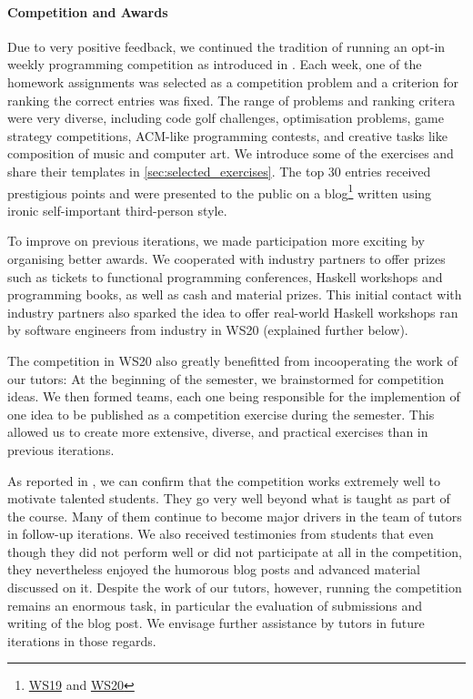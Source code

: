 \paragraph{Competition and Awards}
Due to very positive feedback,
we continued the tradition of running an opt-in weekly
programming competition as introduced in \citep{next_1100}.
Each week, one of the homework assignments
was selected as a competition problem
and a criterion for ranking the correct entries was fixed.
The range of problems and ranking critera were very diverse,
including code golf challenges,
optimisation problems,
game strategy competitions,
ACM-like programming contests,
and creative tasks like composition of music
and computer art.
We introduce some of the exercises and share their templates in \cref{sec:selected_exercises}.
The top 30 entries received prestigious points
and were presented to the public on a blog\footnote{\href{https://www21.in.tum.de/teaching/fpv/WS19/wettbewerb.html}{WS19} and \href{https://www21.in.tum.de/teaching/fpv/WS20/wettbewerb.html}{WS20}}
written using ironic self-important third-person style.

To improve on previous iterations,
we made participation more exciting by organising better awards.
We cooperated with industry partners
to offer prizes such as tickets to functional programming conferences,
Haskell workshops and programming books, as well as cash and material prizes.
This initial contact with industry partners
also sparked the idea to offer real-world Haskell workshops
ran by software engineers from industry in WS20 (explained further below).

The competition in WS20 also greatly benefitted from incooperating the work of our tutors:
At the beginning of the semester,
we brainstormed for competition ideas.
We then formed teams, each one being responsible for the
implemention of one idea to be published as a competition exercise during the semester.
This allowed us to create more extensive, diverse,
and practical exercises than in previous iterations.

As reported in \citep{next_1100},
we can confirm that the competition works extremely well to motivate talented students.
They go very well beyond what is taught as part of the course.
Many of them continue to become major drivers in
the team of tutors in follow-up iterations.
We also received testimonies from students that even though they did not perform well or did not participate at all in the competition,
they nevertheless enjoyed the humorous blog posts and advanced material discussed on it.
Despite the work of our tutors,
however,
running the competition remains an enormous task,
in particular the evaluation of submissions and
writing of the blog post.
We envisage further assistance by tutors in future iterations in those regards.

